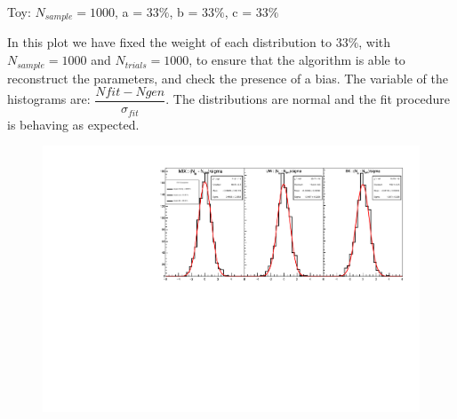 \documentclass[9pt]{beamer}
\newcommand{\nologo}{\setbeamertemplate{logo}{}}
\begin{document}
{\nologo
\begin{frame}[t]{Toy: $N_{sample} = 1000$, a = $ 33\%$, b = $33\%$, c = $33\%$}

In this plot we have fixed the weight of each distribution to $33\%$, with $N_{sample} = 1000$ and $N_{trials} = 1000$, to ensure that the algorithm is able to reconstruct the parameters, and check the presence of a bias.
The variable of the histograms are: $\dfrac{Nfit - Ngen}{\sigma_{fit}}$. The distributions are normal and the fit procedure is behaving as expected.

\begin{figure}[!t]
\includegraphics[width = 1\textwidth]{N1000/ToyNmix(33,33,33).pdf} 
\end{figure}
\end{frame}
}
\end{document}
